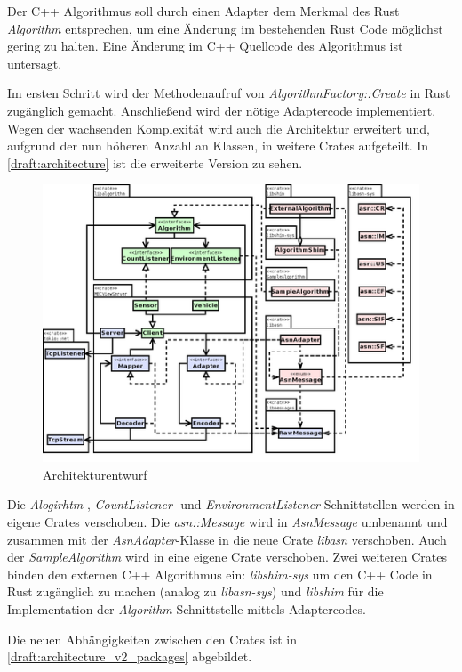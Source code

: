 Der C++ Algorithmus soll durch einen Adapter dem Merkmal des Rust \textit{Algorithm} entsprechen, um eine Änderung im bestehenden Rust Code möglichst gering zu halten.
Eine Änderung im C++ Quellcode des Algorithmus ist untersagt.

Im ersten Schritt wird der Methodenaufruf von \textit{AlgorithmFactory::Create} in Rust zugänglich gemacht.
Anschließend wird der nötige Adaptercode implementiert.
Wegen der wachsenden Komplexität wird auch die Architektur erweitert und, aufgrund der nun höheren Anzahl an Klassen, in weitere Crates aufgeteilt.
In \autoref{draft:architecture} ist die erweiterte Version zu sehen.

\begin{figure}[H]
	\centering
	\includegraphics[width=3.3\textwidth]{dia/architecture_v2}
	\caption{Architekturentwurf}
	\label{draft:architecture_v2}
\end{figure}

Die \textit{Alogirhtm}-, \textit{CountListener}- und \textit{EnvironmentListener}-Schnittstellen werden in eigene Crates verschoben.
Die \textit{asn::Message} wird in \textit{AsnMessage} umbenannt und zusammen mit der \textit{AsnAdapter}-Klasse in die neue Crate \textit{libasn} verschoben.
Auch der \textit{SampleAlgorithm} wird in eine eigene Crate verschoben.
Zwei weiteren Crates binden den externen C++ Algorithmus ein: \textit{libshim-sys} um den C++ Code in Rust zugänglich zu machen (analog zu \textit{libasn-sys}) und \textit{libshim} für die Implementation der \textit{Algorithm}-Schnittstelle mittels Adaptercodes.

Die neuen Abhängigkeiten zwischen den Crates ist in \autoref{draft:architecture_v2_packages} abgebildet.

